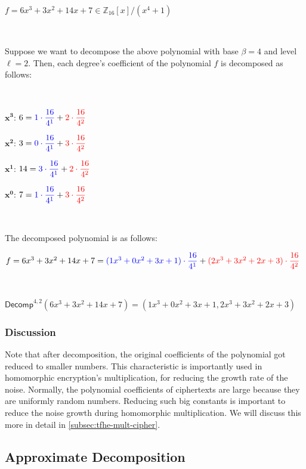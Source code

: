 $ $

$f = 6x^3 + 3x^2 + 14x + 7 \in \mathbb{Z}_{16}[x] / (x^4 + 1)$

$ $

Suppose we want to decompose the above polynomial with base $\beta = 4$ and level $\ell = 2$. Then, each degree's coefficient of the polynomial $f$ is decomposed as follows:

$ $

${\bm{x}^{\bm{3}}}$: $6 = \color{blue}{1 \cdot \dfrac{16}{4^1}} \color{black}+ \color{red}{2 \cdot \dfrac{16}{4^2}}$

${\bm{x}^{\bm{2}}}$: $3 = \color{blue}{0 \cdot \dfrac{16}{4^1}} \color{black}+ \color{red}{3 \cdot \dfrac{16}{4^2}}$

${\bm{x}^{\bm{1}}}$: $14 = \color{blue}{3 \cdot \dfrac{16}{4^1}} \color{black}+ \color{red}{2 \cdot \dfrac{16}{4^2}}$

${\bm{x}^{\bm{0}}}$: $7 = \color{blue}{1 \cdot \dfrac{16}{4^1}} \color{black}+ \color{red}{3 \cdot \dfrac{16}{4^2}}$

$ $

The decomposed polynomial is as follows:

$f = 6x^3 + 3x^2 + 14x + 7 = \color{blue}{(1x^3 + 0x^2 + 3x + 1) \cdot \dfrac{16}{4^1}} \color{black}+ \color{red}{(2x^3 + 3x^2 + 2x + 3) \cdot \dfrac{16}{4^2}} \color{black}$

$ $

$\textsf{Decomp}^{4, 2}(6x^3 + 3x^2 + 14x + 7) = (1x^3 + 0x^2 + 3x + 1, 2x^3 + 3x^2 + 2x + 3)$

\subsubsection{Discussion}

Note that after decomposition, the original coefficients of the polynomial got reduced to smaller numbers. This characteristic is importantly used in homomorphic encryption's multiplication, for reducing the growth rate of the noise. Normally, the polynomial coefficients of ciphertexts are large because they are uniformly random numbers. Reducing such big constants is important to reduce the noise growth during homomorphic multiplication. We will discuss this more in detail in \autoref{subsec:tfhe-mult-cipher}.


\subsection{Approximate Decomposition}
\label{subsec:approx-decomp}

